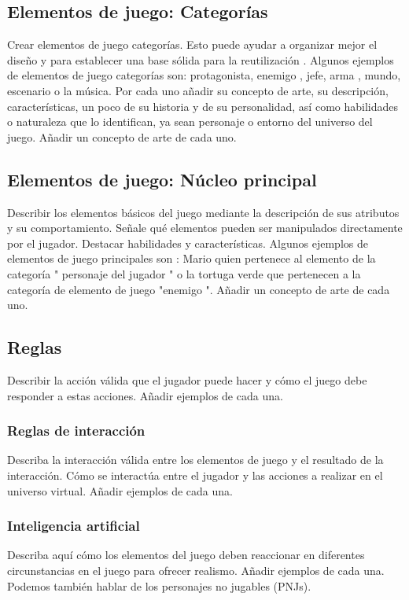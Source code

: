 \subsection{Elementos de juego: Categorías}
Crear elementos de juego categorías. Esto puede ayudar a organizar mejor el diseño y para establecer una base sólida para la reutilización . Algunos ejemplos de elementos de juego categorías son: protagonista, enemigo , jefe, arma , mundo, escenario o la música. Por cada uno añadir su concepto de arte, su descripción, características, un poco de su historia y de su personalidad, así como habilidades o naturaleza que lo identifican, ya sean personaje o entorno del universo del juego. Añadir un concepto de arte de cada uno.

\subsection{Elementos de juego: Núcleo principal}
Describir los elementos básicos del juego mediante la descripción de sus atributos y su comportamiento. Señale qué elementos pueden ser manipulados directamente por el jugador. Destacar habilidades y características. Algunos ejemplos de elementos de juego principales son : Mario quien pertenece al elemento de la categoría " personaje del jugador " o la tortuga verde que pertenecen a la categoría de elemento de juego "enemigo ". Añadir un concepto de arte de cada uno.

\subsection{Reglas}
Describir la acción válida que el jugador puede hacer y cómo el juego debe responder a estas acciones. Añadir ejemplos de cada una.

\subsubsection{Reglas de interacción}
Describa la interacción válida entre los elementos de juego y el resultado de la interacción. Cómo se interactúa entre el jugador y las acciones a realizar en el universo virtual. Añadir ejemplos de cada una.

\subsubsection{Inteligencia artificial}
Describa aquí cómo los elementos del juego deben reaccionar en diferentes circunstancias en el juego para ofrecer realismo. Añadir ejemplos de cada una. Podemos también hablar de los personajes no jugables (PNJs).

